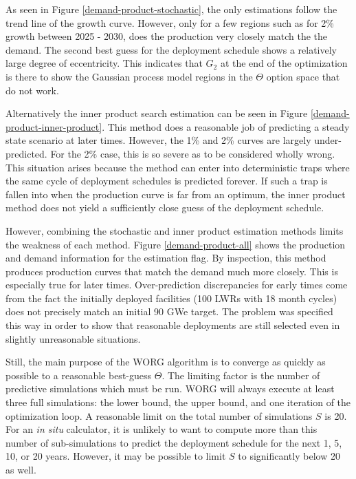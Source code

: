 As seen in Figure \ref{demand-product-stochastic}, the \stochastic only 
estimations follow the trend line of the growth curve.  However, only for
a few regions such as for 2\% growth between 2025 - 2030, does the 
production very closely match the the demand.  The second best guess for the 
deployment schedule shows a relatively large degree of eccentricity. This 
indicates that $G_2$ at the end of the optimization is there to show the 
Gaussian process model regions in the $\Theta$ option space that do not work. 

Alternatively the inner product search estimation can be seen in Figure 
\ref{demand-product-inner-product}. This method does a reasonable job of
predicting a steady state scenario at later times. However, the 1\% and 2\%
curves are largely under-predicted.  For the 2\% case, this is so severe
as to be considered wholly wrong. This situation arises because the 
\innerprod method can enter into deterministic traps where the same cycle
of deployment schedules is predicted forever.  If such a trap is fallen
into when the 
production curve is far from an optimum, the inner product method does not
yield a sufficiently close guess of the deployment schedule.

However, combining the stochastic and inner product estimation methods limits
the weakness of each method. Figure \ref{demand-product-all} shows the 
production and demand information for the \allflag estimation flag. 
By inspection, 
this method produces production curves that match the demand much more 
closely. This is especially true for later times. Over-prediction 
discrepancies for early times come from the fact the initially deployed 
facilities (100 LWRs with 18 month cycles) does not precisely match an 
initial 90 GWe target. The problem was specified this way in order to show 
that reasonable deployments are still selected even in slightly 
unreasonable situations.

Still, the main purpose of the WORG algorithm is to converge as quickly as 
possible to a reasonable best-guess $\Theta$. The limiting factor is the 
number of 
predictive simulations which must be run. WORG will always execute 
at least three full simulations: the lower bound, the upper bound, and one
iteration of the optimization loop. A reasonable limit on the total number 
of simulations $S$ is 20.  For an \emph{in situ} calculator, it is unlikely
to want to compute more than this number of sub-simulations to predict 
the deployment schedule for the next 1, 5, 10, or 20 years. However, it 
may be possible to limit $S$ to significantly below 20 as well.

